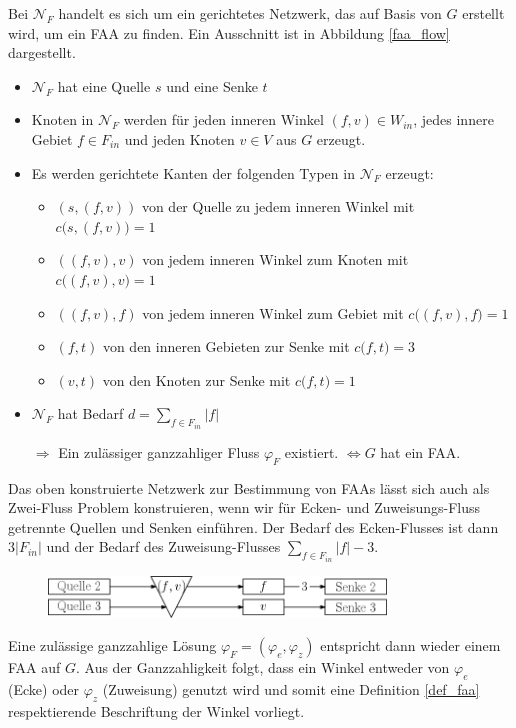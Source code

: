 \begin{network}[FAA]\label{net_faa}
Bei $\mathcal{N}_F$ handelt es sich um ein gerichtetes Netzwerk, das auf Basis von $G$ erstellt wird, um ein FAA zu finden. Ein Ausschnitt ist in Abbildung \ref{faa_flow} dargestellt.
	\begin{itemize}
	\item $\mathcal{N}_F$ hat eine Quelle $s$ und eine Senke $t$
	\item Knoten in $\mathcal{N}_F$ werden für jeden inneren Winkel $(f,v) \in W_{in}$, jedes innere Gebiet $f\in F_{in}$ und jeden Knoten $v \in V$ aus $G$ erzeugt.
	\item Es werden gerichtete Kanten der folgenden Typen in $\mathcal{N}_F$ erzeugt:
		\begin{itemize}
		\item $(s,(f,v))$ von der Quelle zu jedem inneren Winkel mit $c\big(s,(f,v)\big) = 1$
		\item $((f,v),v)$ von jedem inneren Winkel zum Knoten mit $c\big((f,v),v\big) = 1$
		\item $((f,v),f)$ von jedem inneren Winkel zum Gebiet mit $c\big((f,v),f\big) = 1$
		\item $(f,t)$ von den inneren Gebieten zur Senke mit $c\big(f,t\big) = 3$
		\item $(v,t)$ von den Knoten zur Senke mit $c\big(f,t\big) = 1$
		\end{itemize}
	\item $\mathcal{N}_F$ hat Bedarf $d=\sum_{f \in F_{in}}|f|$
	\item [$\Rightarrow$]Ein zulässiger ganzzahliger Fluss $\varphi_F$ existiert. $\Leftrightarrow G$ hat ein FAA.
	\end{itemize}
	
\end{network}

\begin{remark}

Das oben konstruierte Netzwerk zur Bestimmung von FAAs lässt sich auch als Zwei-Fluss Problem konstruieren, wenn wir für Ecken- und Zuweisungs-Fluss getrennte Quellen und Senken einführen. Der Bedarf des Ecken-Flusses ist dann $3|F_{in}|$ und der Bedarf des Zuweisung-Flusses $\sum_{f \in F_{in}}{|f|-3}$.

\begin{figure}[h]
	\centering
  \includegraphics[width=0.8\textwidth]{faa_2_flow.png}
\end{figure}

Eine zulässige ganzzahlige Lösung $\varphi_F = (\varphi_e,\varphi_z)$ entspricht dann wieder einem FAA auf $G$. Aus der Ganzzahligkeit folgt, dass ein Winkel entweder von $\varphi_{e}$ (Ecke) oder $\varphi_{z}$ (Zuweisung) genutzt wird und somit eine Definition \ref{def_faa} respektierende Beschriftung der Winkel vorliegt.

\end{remark}


